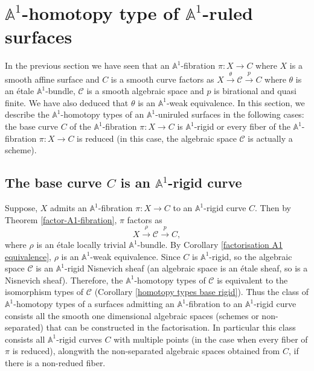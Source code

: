 \documentclass[11pt, reqno]{amsart}
\theoremstyle{plain}
\theoremstyle{definition}
\newcommand{\sC}{{\mathcal C}}
\newcommand{\A}{{\mathbb A}}
\begin{document}
\section{$\mathbb{A}^1$-homotopy type of $\mathbb{A}^1$-ruled surfaces} \label{section a1 homotopy types}
In the previous section we have seen that an $\A^1$-fibration $\pi : X \to C$ where $X$ is a smooth affine surface and $C$ is a smooth curve factors as $X \xrightarrow{\theta}\sC\xrightarrow{p} C$ where $\theta$ is an étale $\A^1$-bundle, $\sC$ is a smooth algebraic space and $p$ is birational and quasi finite. We have also deduced that $\theta$ is an $\A^1$-weak equivalence.
 In this section, we describe the $\A^1$-homotopy types of an $\A^1$-uniruled surfaces in the following cases: %
the base curve $C$ of the $\A^1$-fibration $\pi: X \to C$ is $\A^1$-rigid
or every fiber of the $\A^1$-fibration $\pi: X \to C$ is reduced (in this case, the algebraic space $\sC$ is actually a scheme).


\subsection{The base curve $C$ is an $\mathbb{A}^1$-rigid curve}
Suppose, $X$ admits an $\mathbb{A}^1$-fibration $\pi: X \to C$ to an $\mathbb{A}^1$-rigid curve $C$. Then by Theorem \ref{factor-A1-fibration}, $\pi$ factors as
$$X \xrightarrow{\rho} \mathcal{C} \xrightarrow{p} C,$$
where $\rho$ is an étale locally trivial $\mathbb{A}^1$-bundle. By Corollary \ref{factorisation A1 equivalence}, $\rho$ is an $\mathbb{A}^1$-weak equivalence. Since $C$ is $\mathbb{A}^1$-rigid, so the algebraic space $\mathcal{C}$ is an $\mathbb{A}^1$-rigid Nisnevich sheaf (an algebraic space is an étale sheaf, so is a Nisnevich sheaf). Therefore, the $\mathbb{A}^1$-homotopy types of $\mathcal{C}$ is equivalent to the isomorphism types of $\mathcal{C}$ (Corollary \ref{homotopy types base rigid}). Thus the class of $\mathbb{A}^1$-homotopy types of a surfaces admitting an $\mathbb{A}^1$-fibration to an $\mathbb{A}^1$-rigid curve consists all the smooth one dimensional algebraic spaces (schemes or non-separated) that can be constructed in the factorisation. In particular this class consists all $\mathbb{A}^1$-rigid curves $C$ with multiple points (in the case when every fiber of $\pi$ is reduced), alongwith the non-separated algebraic spaces obtained from $C$, if there is a non-redued fiber.
\end{document}
